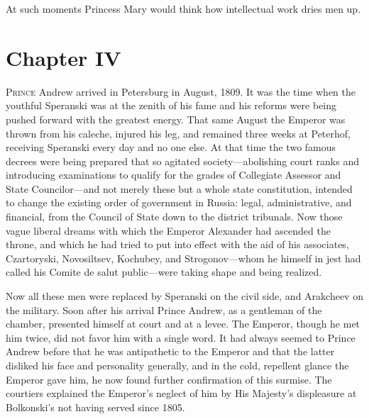 At such moments Princess Mary would think how intellectual work
dries men up.


\chapter*{Chapter IV}
\ifaudio     
{} 
\fi

\lettrine[lines=2, loversize=0.3, lraise=0]{\initfamily P}{rince}
Andrew arrived in Petersburg in August, 1809. It was the
time when the youthful Speranski was at the zenith of his fame
and his reforms were being pushed forward with the greatest
energy. That same August the Emperor was thrown from his caleche,
injured his leg, and remained three weeks at Peterhof, receiving
Speranski every day and no one else. At that time the two famous
decrees were being prepared that so agitated society---abolishing
court ranks and introducing examinations to qualify for the
grades of Collegiate Assessor and State Councilor---and not
merely these but a whole state constitution, intended to change
the existing order of government in Russia: legal,
administrative, and financial, from the Council of State down to
the district tribunals. Now those vague liberal dreams with which
the Emperor Alexander had ascended the throne, and which he had
tried to put into effect with the aid of his associates,
Czartoryski, Novosiltsev, Kochubey, and Strogonov---whom he
himself in jest had called his Comite de salut public---were
taking shape and being realized.

Now all these men were replaced by Speranski on the civil side,
and Arakcheev on the military. Soon after his arrival Prince
Andrew, as a gentleman of the chamber, presented himself at court
and at a levee. The Emperor, though he met him twice, did not
favor him with a single word.  It had always seemed to Prince
Andrew before that he was antipathetic to the Emperor and that
the latter disliked his face and personality generally, and in
the cold, repellent glance the Emperor gave him, he now found
further confirmation of this surmise. The courtiers explained the
Emperor's neglect of him by His Majesty's displeasure at
Bolkonski's not having served since 1805.

